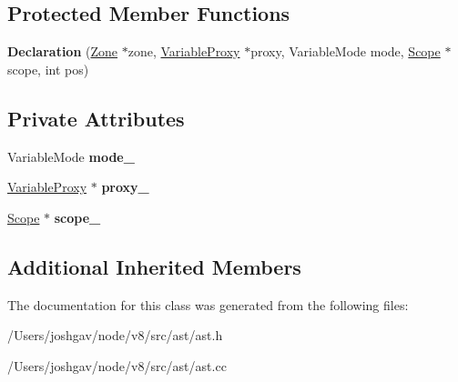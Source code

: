\subsection*{Protected Member Functions}
\begin{DoxyCompactItemize}
\item 
{\bfseries Declaration} (\hyperlink{classv8_1_1internal_1_1_zone}{Zone} $\ast$zone, \hyperlink{classv8_1_1internal_1_1_variable_proxy}{Variable\+Proxy} $\ast$proxy, Variable\+Mode mode, \hyperlink{classv8_1_1internal_1_1_scope}{Scope} $\ast$scope, int pos)\hypertarget{classv8_1_1internal_1_1_declaration_a222d6f7ae3b291f5e00249cca9fec476}{}\label{classv8_1_1internal_1_1_declaration_a222d6f7ae3b291f5e00249cca9fec476}

\end{DoxyCompactItemize}
\subsection*{Private Attributes}
\begin{DoxyCompactItemize}
\item 
Variable\+Mode {\bfseries mode\+\_\+}\hypertarget{classv8_1_1internal_1_1_declaration_a6b6e3003bd16c17f8e3998448bc45acb}{}\label{classv8_1_1internal_1_1_declaration_a6b6e3003bd16c17f8e3998448bc45acb}

\item 
\hyperlink{classv8_1_1internal_1_1_variable_proxy}{Variable\+Proxy} $\ast$ {\bfseries proxy\+\_\+}\hypertarget{classv8_1_1internal_1_1_declaration_a4a3a3c969a3bba71b1a1674f1b0225a2}{}\label{classv8_1_1internal_1_1_declaration_a4a3a3c969a3bba71b1a1674f1b0225a2}

\item 
\hyperlink{classv8_1_1internal_1_1_scope}{Scope} $\ast$ {\bfseries scope\+\_\+}\hypertarget{classv8_1_1internal_1_1_declaration_adaef932b3cedc4c2edab86c9b909fffe}{}\label{classv8_1_1internal_1_1_declaration_adaef932b3cedc4c2edab86c9b909fffe}

\end{DoxyCompactItemize}
\subsection*{Additional Inherited Members}


The documentation for this class was generated from the following files\+:\begin{DoxyCompactItemize}
\item 
/\+Users/joshgav/node/v8/src/ast/ast.\+h\item 
/\+Users/joshgav/node/v8/src/ast/ast.\+cc\end{DoxyCompactItemize}
